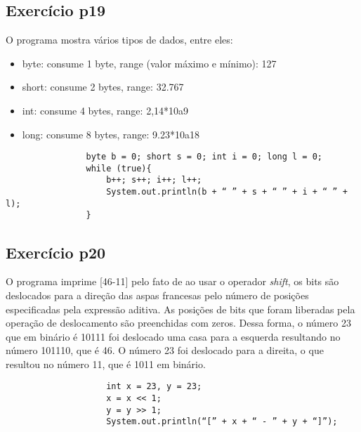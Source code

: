 \documentclass[12pt]{article}
\begin{document}
        \subsection{Exercício p19}
        O  programa mostra vários tipos de dados, entre eles:
        \begin{itemize}
            \item byte: consume 1 byte, range (valor máximo e mínimo): 127
            \item short: consume 2 bytes, range: 32.767
            \item int: consume 4 bytes, range: 2,14*10a9
            \item long: consume 8 bytes, range: 9.23*10a18
        \end{itemize}
        \begin{scriptsize}
            
            \begin{lstlisting}
                byte b = 0; short s = 0; int i = 0; long l = 0;
                while (true){
                    b++; s++; i++; l++;
                    System.out.println(b + “ ” + s + “ ” + i + “ ” + l);
                }
            \end{lstlisting}
            \end{scriptsize}

            \subsection{Exercício p20}
            O  programa imprime [46-11] pelo fato de ao usar o operador \textit{shift}, os bits são 
            deslocados para a direção das aspas francesas pelo número de posições especificadas pela 
            expressão aditiva. As posições de bits que foram liberadas pela operação de deslocamento 
            são preenchidas com zeros. Dessa forma, o número 23 que em binário é 10111 foi deslocado 
            uma casa para a esquerda resultando no número 101110, que é 46. O número 23 foi deslocado
            para a direita, o que resultou no número 11, que é 1011 em binário.
            \begin{scriptsize}

                
                \begin{lstlisting}
                    int x = 23, y = 23;
                    x = x << 1;
                    y = y >> 1;
                    System.out.println(“[” + x + “ - ” + y + “]”);
                \end{lstlisting}
                \end{scriptsize}
\end{document}
